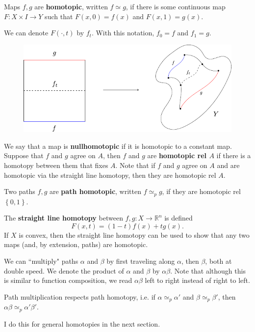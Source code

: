 \documentclass[twoside,10pt]{report}
\begin{document}
\begin{defn}[]
	Maps $f,g$ are \textbf{homotopic}, written $f \simeq g$, if there is some continuous map $F:X\times I\to Y$ such that $F(x,0)=f(x)$ and $F(x,1)=g(x)$.
\end{defn}
We can denote $F(\cdot,t)$ by $f_{t}$. With this notation, $f_0=f$ and $f_1=g$.

\begin{figure}[H]
	\centering
	\includegraphics[scale=1]{fig/homotopy.pdf}
\end{figure}

We say that a map is \textbf{nullhomotopic} if it is homotopic to a constant map. Suppose that $f$ and $g$ agree on $A$, then $f$ and $g$ are \textbf{homotopic rel $A$} if there is a homotopy between them that fixes $A$. Note that if $f$ and $g$ agree on $A$ and are homotopic via the straight line homotopy, then they are homotopic rel $A$.

\begin{defn}[]
Two paths $f,g$ are \textbf{path homotopic}, written $f \simeq_p g$, if they are homotopic rel $\left\{ 0,1 \right\}$.
\end{defn}

The \textbf{straight line homotopy} between $f,g:X\to \mathbb{R}^{n}$ is defined
\[
	F(x,t) = (1-t)f(x)+tg(x).
\] 
If $X$ is convex, then the straight line homotopy can be used to show that any two maps (and, by extension, paths) are homotopic.

We can ``multiply" paths $\alpha$ and $\beta$ by first traveling along $\alpha$, then $\beta$, both at double speed. We denote the product of $\alpha$ and $\beta$ by $\alpha\beta$. Note that although this is similar to function composition, we read $\alpha\beta$ left to right instead of right to left.

\begin{prop}
Path multiplication respects path homotopy, i.e. if $\alpha \simeq_p \alpha'$ and $\beta \simeq_p \beta'$, then $\alpha\beta \simeq_{p} \alpha'\beta'$.
\end{prop}
{\color{red}I do this for general homotopies in the next section.}
\end{document}
